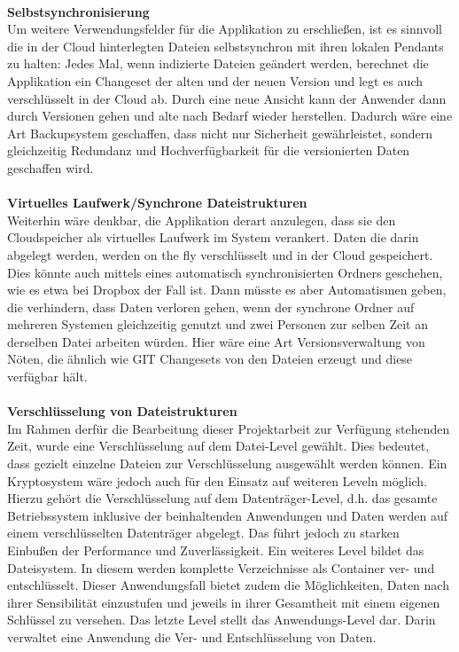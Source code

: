 \documentclass[13pt,a4paper,bibliography=totocnumbered,listof=totocnumbered]{scrartcl}
\begin{document}
\\\textbf{Selbstsynchronisierung}\\
Um weitere Verwendungsfelder für die Applikation zu erschließen, ist es sinnvoll die in der Cloud hinterlegten Dateien selbstsynchron mit ihren lokalen Pendants zu halten: Jedes Mal, wenn indizierte Dateien geändert werden, berechnet die Applikation ein Changeset der alten und der neuen Version und legt es auch verschlüsselt in der Cloud ab. Durch eine neue Ansicht kann der Anwender dann durch Versionen gehen und alte nach Bedarf wieder herstellen. Dadurch wäre eine Art Backupsystem geschaffen, dass nicht nur Sicherheit gewährleistet, sondern gleichzeitig Redundanz und Hochverfügbarkeit für die versionierten Daten geschaffen wird.\\
\\\textbf{Virtuelles Laufwerk/Synchrone Dateistrukturen}\\
Weiterhin wäre denkbar, die Applikation derart anzulegen, dass sie den Cloudspeicher als virtuelles Laufwerk im System verankert. Daten die darin abgelegt werden, werden on the fly verschlüsselt und in der Cloud gespeichert. Dies könnte auch mittels eines automatisch synchronisierten Ordners geschehen, wie es etwa bei Dropbox der Fall ist. Dann müsste es aber Automatismen geben, die verhindern, dass Daten verloren gehen, wenn der synchrone Ordner auf mehreren Systemen gleichzeitig genutzt und zwei Personen zur selben Zeit an derselben Datei arbeiten würden. Hier wäre eine Art Versionsverwaltung von Nöten, die ähnlich wie GIT Changesets von den Dateien erzeugt und diese verfügbar hält.\\
\\\textbf{Verschlüsselung von Dateistrukturen}\\
Im Rahmen derfür die Bearbeitung dieser Projektarbeit zur Verfügung stehenden Zeit, wurde eine Verschlüsselung auf dem Datei-Level gewählt. Dies bedeutet, dass gezielt einzelne Dateien zur Verschlüsselung ausgewählt werden können. Ein Kryptosystem wäre jedoch auch für den Einsatz auf weiteren Leveln möglich. Hierzu gehört die Verschlüsselung auf dem Datenträger-Level, d.h. das gesamte Betriebssystem inklusive der beinhaltenden Anwendungen und Daten werden auf einem verschlüsselten Datenträger abgelegt. Das führt jedoch zu starken Einbußen der Performance und Zuverlässigkeit. Ein weiteres Level bildet das Dateisystem. In diesem werden komplette Verzeichnisse als Container ver- und entschlüsselt. Dieser Anwendungsfall bietet zudem die Möglichkeiten, Daten nach ihrer Sensibilität einzustufen und jeweils in ihrer Gesamtheit mit einem eigenen Schlüssel zu versehen. Das letzte Level stellt das Anwendungs-Level dar. Darin verwaltet eine Anwendung die Ver- und Entschlüsselung von Daten. \cite{38}\\
\end{document}

